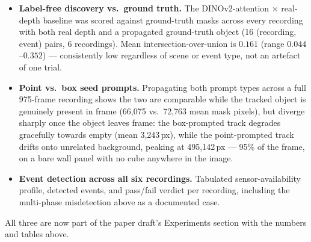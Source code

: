 \documentclass[11pt]{article}
\begin{document}
\begin{itemize}
\item \textbf{Label-free discovery vs.\ ground truth.} The DINOv2-attention
$\times$ real-depth baseline was scored against ground-truth masks across
every recording with both real depth and a propagated ground-truth object
(16 (recording, event) pairs, 6 recordings). Mean intersection-over-union
is $0.161$ (range $0.044$--$0.352$) --- consistently low regardless of
scene or event type, not an artefact of one trial.
\item \textbf{Point vs.\ box seed prompts.} Propagating both prompt types
across a full 975-frame recording shows the two are comparable while the
tracked object is genuinely present in frame (66{,}075 vs.\ 72{,}763 mean
mask pixels), but diverge sharply once the object leaves frame: the
box-prompted track degrades gracefully towards empty (mean 3{,}243\,px),
while the point-prompted track drifts onto unrelated background, peaking
at 495{,}142\,px --- 95\% of the frame, on a bare wall panel with no cube
anywhere in the image.
\item \textbf{Event detection across all six recordings.} Tabulated
sensor-availability profile, detected events, and pass/fail verdict per
recording, including the multi-phase misdetection above as a documented
case.
\end{itemize}

All three are now part of the paper draft's Experiments section with the
numbers and tables above.
\end{document}
